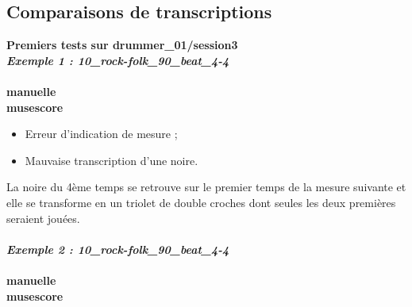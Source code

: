 \subsection{Comparaisons de transcriptions}
\textbf{Premiers tests sur drummer\_01/session3}\\

\textbf{\textit{Exemple 1 : 10\_rock-folk\_90\_beat\_4-4}}\\\\
\textbf{manuelle}\\
\textbf{musescore}\\
\begin{itemize}
	\item Erreur d’indication de mesure ;
	\item Mauvaise transcription d’une noire.\\
\end{itemize}
La noire du 4ème temps se retrouve sur le premier temps de la mesure suivante et elle se transforme en un triolet de double croches dont seules les deux premières seraient jouées.\\\\
\textbf{\textit{Exemple 2 : 10\_rock-folk\_90\_beat\_4-4}}\\\\
\textbf{manuelle}\\
\textbf{musescore}\\
